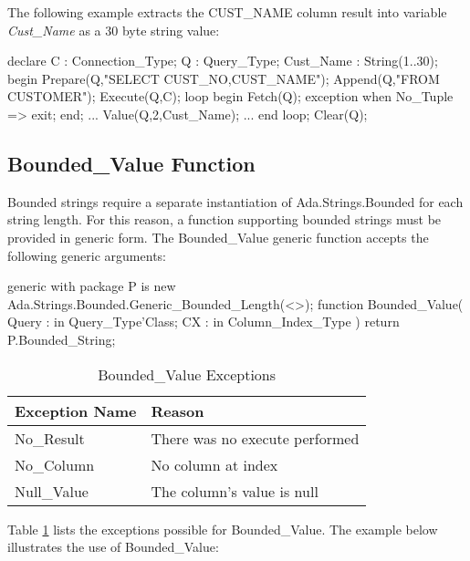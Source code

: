 \documentclass[english,letterpaper]{book}
\begin{document}
The following example extracts the CUST\_NAME column result into variable
\emph{Cust\_Name} as a 30 byte string value:

\begin{Example}
declare
   C :         Connection_Type;
   Q :         Query_Type;
   Cust_Name : String(1..30);
begin
   Prepare(Q,"SELECT CUST_NO,CUST_NAME");
   Append(Q,"FROM CUSTOMER");
   Execute(Q,C);
   loop
      begin
         Fetch(Q);
      exception
         when No_Tuple =>
            exit;
      end;
      ...
      Value(Q,2,Cust_Name);
      ...
   end loop;
   Clear(Q);
\end{Example}



\subsection{Bounded\_Value Function}

Bounded strings require a separate instantiation of
Ada\-.Strings\-.Bounded for each string length.
For this reason, a function supporting bounded strings must be provided
in generic form. The Bounded\_Value generic function accepts
the following generic arguments:

\begin{Code}
generic
   with package P is new
      Ada.Strings.Bounded.Generic_Bounded_Length(<>);
function Bounded_Value(
   Query : in Query_Type'Class;
   CX :    in Column_Index_Type
) return P.Bounded_String;
\end{Code}

\begin{table}
   \begin{center}
      \begin{tabular}{ll}
         Exception Name    &  Reason\\
         \hline 
         No\_Result        &  There was no execute performed\\
         No\_Column        &  No column at index\\
         Null\_Value       &  The column's value is null\\
      \end{tabular}
   \end{center}
   \caption{Bounded\_Value Exceptions}\label{t:bvx}
\end{table}

Table \ref{t:bvx} lists the exceptions possible for Bounded\_Value.
The example below illustrates the use of Bounded\_Value:
\end{document}
